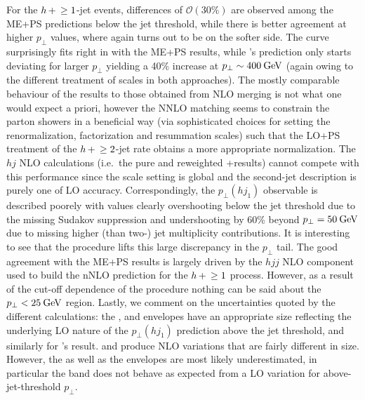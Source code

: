 For the $h\!\text{~+~}\!\ge1$-jet events, differences of $\mathcal{O}(30\%)$ are
observed among the ME+PS predictions below the jet threshold, while
there is better agreement at higher $p_\perp$ values, where again
\Herwig turns out to be on the softer side. The \Powheg curve
surprisingly fits right in with the ME+PS results, while \Sherpa's
\NNLOPS prediction only starts deviating for larger $p_\perp$ yielding
a 40\% increase at $p_\perp\sim400\text{\:GeV}$ (again owing to the different
treatment of scales in both approaches). The mostly comparable
behaviour of the \NNLOPS results to those obtained from NLO merging is
not what one would expect a priori, however the NNLO matching seems to
constrain the parton showers in a beneficial way (via sophisticated
choices for setting the renormalization, factorization and resummation
scales) such that the LO+PS treatment of the $h\!\text{~+~}\!\ge2$-jet rate
obtains a more appropriate normalization. The $hj$ NLO calculations
(i.e.~the pure and \Minlo reweighted \GoSam+\Sherpa results) cannot
compete with this performance since the scale setting is global and
the second-jet description is purely one of LO accuracy.
Correspondingly, the $p_\perp(hj_1)$ observable is described poorely
with values clearly overshooting below the jet threshold due to the
missing Sudakov suppression and undershooting by 60\% beyond
$p_\perp=50\text{\:GeV}$ due to missing higher (than two-) jet multiplicity
contributions. It is interesting to see that the \Loopsim procedure
lifts this large discrepancy in the $p_\perp$ tail. The good agreement
with the ME+PS results is largely driven by the $hjj$ NLO component
used to build the nNLO prediction for the $h\!\text{~+~}\!\ge1$ process. However,
as a result of the cut-off dependence of the procedure nothing can
be said about the $p_\perp<25\text{\:GeV}$ region. Lastly, we comment on the
uncertainties quoted by the different calculations: the \GoSam, \Minlo
and \Loopsim envelopes have an appropriate size reflecting the
underlying LO nature of the $p_\perp(hj_1)$ prediction above the jet
threshold, and similarly for \Sherpa's \NNLOPS result. \MGaMC and
\Herwig produce NLO variations that are fairly different in size.
However, the \Herwig as well as the \Powheg envelopes are most likely
underestimated, in particular the \Powheg band does not behave as
expected from a LO variation for above-jet-threshold $p_\perp$.

